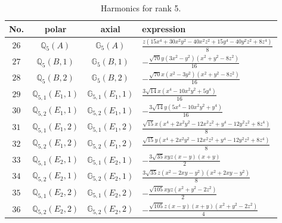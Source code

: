 \documentclass[fleqn,8pt,landscape]{jsarticle}
\begin{document}
\begin{table}[ht!]
\begin{center}
\caption{Harmonics for rank 5.}
\renewcommand{\arraystretch}{1.3}
\begin{tabular}{cccl} \hline \hline
No. & polar & axial & expression \\ \hline
$ 26 $ & $ \mathbb{Q}_{5}(A) $ & $ \mathbb{G}_{5}(A) $ & $ \frac{z \left(15 x^{4} + 30 x^{2} y^{2} - 40 x^{2} z^{2} + 15 y^{4} - 40 y^{2} z^{2} + 8 z^{4}\right)}{8} $ \\
$ 27 $ & $ \mathbb{Q}_{5}(B,1) $ & $ \mathbb{G}_{5}(B,1) $ & $ - \frac{\sqrt{70} y \left(3 x^{2} - y^{2}\right) \left(x^{2} + y^{2} - 8 z^{2}\right)}{16} $ \\
$ 28 $ & $ \mathbb{Q}_{5}(B,2) $ & $ \mathbb{G}_{5}(B,2) $ & $ - \frac{\sqrt{70} x \left(x^{2} - 3 y^{2}\right) \left(x^{2} + y^{2} - 8 z^{2}\right)}{16} $ \\
$ 29 $ & $ \mathbb{Q}_{5,1}(E_{1},1) $ & $ \mathbb{G}_{5,1}(E_{1},1) $ & $ \frac{3 \sqrt{14} x \left(x^{4} - 10 x^{2} y^{2} + 5 y^{4}\right)}{16} $ \\
$ 30 $ & $ \mathbb{Q}_{5,2}(E_{1},1) $ & $ \mathbb{G}_{5,2}(E_{1},1) $ & $ - \frac{3 \sqrt{14} y \left(5 x^{4} - 10 x^{2} y^{2} + y^{4}\right)}{16} $ \\
$ 31 $ & $ \mathbb{Q}_{5,1}(E_{1},2) $ & $ \mathbb{G}_{5,1}(E_{1},2) $ & $ \frac{\sqrt{15} x \left(x^{4} + 2 x^{2} y^{2} - 12 x^{2} z^{2} + y^{4} - 12 y^{2} z^{2} + 8 z^{4}\right)}{8} $ \\
$ 32 $ & $ \mathbb{Q}_{5,2}(E_{1},2) $ & $ \mathbb{G}_{5,2}(E_{1},2) $ & $ \frac{\sqrt{15} y \left(x^{4} + 2 x^{2} y^{2} - 12 x^{2} z^{2} + y^{4} - 12 y^{2} z^{2} + 8 z^{4}\right)}{8} $ \\
$ 33 $ & $ \mathbb{Q}_{5,1}(E_{2},1) $ & $ \mathbb{G}_{5,1}(E_{2},1) $ & $ - \frac{3 \sqrt{35} x y z \left(x - y\right) \left(x + y\right)}{2} $ \\
$ 34 $ & $ \mathbb{Q}_{5,2}(E_{2},1) $ & $ \mathbb{G}_{5,2}(E_{2},1) $ & $ \frac{3 \sqrt{35} z \left(x^{2} - 2 x y - y^{2}\right) \left(x^{2} + 2 x y - y^{2}\right)}{8} $ \\
$ 35 $ & $ \mathbb{Q}_{5,1}(E_{2},2) $ & $ \mathbb{G}_{5,1}(E_{2},2) $ & $ - \frac{\sqrt{105} x y z \left(x^{2} + y^{2} - 2 z^{2}\right)}{2} $ \\
$ 36 $ & $ \mathbb{Q}_{5,2}(E_{2},2) $ & $ \mathbb{G}_{5,2}(E_{2},2) $ & $ - \frac{\sqrt{105} z \left(x - y\right) \left(x + y\right) \left(x^{2} + y^{2} - 2 z^{2}\right)}{4} $ \\
 \hline \hline
\end{tabular}
\end{center}
\end{table}
\end{document}
